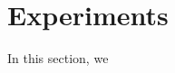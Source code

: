 \documentclass[conference]{IEEEtran}
\begin{document}
\section{Experiments}
In this section, we 
%
%



%
%
\end{document}
